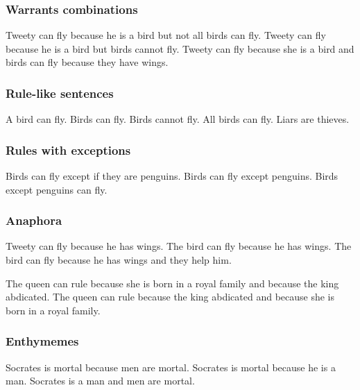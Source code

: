 \subsubsection{Warrants combinations}
\begin{exe}
\ex\label{e48} Tweety can fly because he is a bird but not all birds can fly.
\ex\label{e49} Tweety can fly because he is a bird but birds cannot fly.
\ex\label{e50} Tweety can fly because she is a bird and birds can fly because they have wings.
\end{exe}

\subsubsection{Rule-like sentences}
\begin{exe}
\ex\label{e51} A bird can fly.
\ex\label{e52} Birds can fly.
\ex\label{e53} Birds cannot fly.
\ex\label{e54} All birds can fly.
\ex\label{e55} Liars are thieves.
\end{exe}

\subsubsection{Rules with exceptions}
\begin{exe}
\ex\label{e56} Birds can fly except if they are penguins.
\ex\label{e57} Birds can fly except penguins.
\ex\label{e58} Birds except penguins can fly.
\end{exe}

\subsubsection{Anaphora}
\begin{exe}
\ex\label{e59} Tweety can fly because he has wings.
\ex\label{e60} The bird can fly because he has wings.
\ex\label{e61} The bird can fly because he has wings and they help him.
\end{exe}

\begin{exe}
\ex\label{e62} The queen can rule because she is born in a royal family and because the king abdicated.
\ex\label{e63} The queen can rule because the king abdicated and because she is born in a royal family.
\end{exe}

\subsubsection{Enthymemes}
\begin{exe}
\ex\label{e64} Socrates is mortal because men are mortal.
\ex\label{e65} Socrates is mortal because he is a man.
\ex\label{e66} Socrates is a man and men are mortal.
\end{exe}

